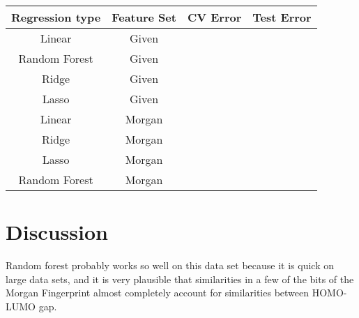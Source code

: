 \documentclass[11pt]{article}
\begin{document}
\begin{center}
\begin{tabular}{|c|c|c|c|}
\hline
Regression type & Feature Set & CV Error & Test Error\\
\hline
Linear &Given &&\\
Random Forest & Given&&\\
Ridge & Given&&\\
Lasso &Given&&\\
Linear&Morgan&&\\
Ridge&Morgan&&\\
Lasso&Morgan&&\\
Random Forest&Morgan&&\\
\hline
\end{tabular}
\end{center}

\section{Discussion}
Random forest probably works so well on this data set because it is quick on large data sets, and it is very plausible that similarities in a few of the bits of the Morgan Fingerprint almost completely account for similarities between HOMO-LUMO gap.
\end{document}

